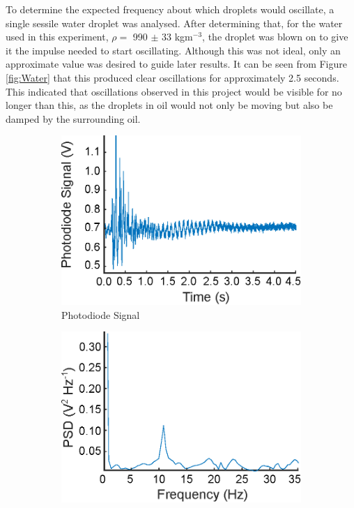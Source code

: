 \documentclass{physics_article_B}
\begin{document}
    To determine the expected frequency about which droplets would oscillate, a single sessile water droplet was analysed. After determining that, for the water used in this experiment, $\rho =$ 990 $\pm$ 33 kgm$^{-3}$, the droplet was blown on to give it the impulse needed to start oscillating. Although this was not ideal, only an approximate value was desired to guide later results. It can be seen from Figure \ref{fig:Water} that this produced clear oscillations for approximately 2.5 seconds. This indicated that oscillations observed in this project would be visible for no longer than this, as the droplets in oil would not only be moving but also be damped by the surrounding oil. 
 
            \begin{figure}[H]
            \centering
                    \begin{subfigure}[b]{0.48\textwidth} \hspace*{-0.2cm}\includegraphics[width=\textwidth]{Figures/WaterSignal.eps}
                    \caption{Photodiode Signal}
                    \label{fig:Water:Signal}
                \end{subfigure}\hspace{3pt}
                \begin{subfigure}[b]{0.48\textwidth}
                    \hspace*{0.2cm}\includegraphics[width=\textwidth]{Figures/WaterSignalPD.eps}

\end{subfigure}
\end{figure}
\end{document}
